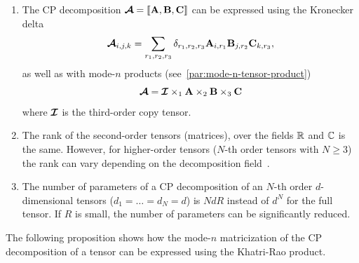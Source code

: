 \begin{remark}
\begin{enumerate}
\item The CP decomposition $\bm{\mathcal{A}} = \llbracket \mathbf{A},\mathbf{B},\mathbf{C} \rrbracket$ can be expressed using the Kronecker delta 
$$\bm{\mathcal{A}}_{i,j,k} = \sum_{r_1,r_2,r_3}\delta_{r_1,r_2,r_3}\mathbf{A}_{i,r_1}\mathbf{B}_{j,r_2}\mathbf{C}_{k,r_3},$$
as well as with mode-$n$ products (see~\ref{par:mode-n-tensor-product}) 
$$\bm{\mathcal{A}} = \bm{\mathcal{I}}\times_{1}\mathbf{A}\times_{2}\mathbf{B}\times_{3}\mathbf{C}$$
where $\bm{\mathcal{I}}$ is the third-order copy tensor. 
\item The rank of the second-order tensors (matrices), over the fields $\mathbb{R}$ and $\mathbb{C}$ is the same. However, for higher-order tensors ($N$-th order tensors with $N\geq3$) the rank can vary depending on the decomposition field~\citep{kruskal1989rank}.
\item The number of parameters of a CP decomposition of an $N$-th order $d$-dimensional tensors ($d_1 = \dots = d_N = d$) is $NdR$ instead of $d^N$ for the full tensor. If $R$ is small, the number of parameters can be significantly reduced. 
\end{enumerate}
\end{remark}
The following proposition shows how the mode-$n$ matricization of the CP decomposition of a tensor can be expressed using the Khatri-Rao product.
